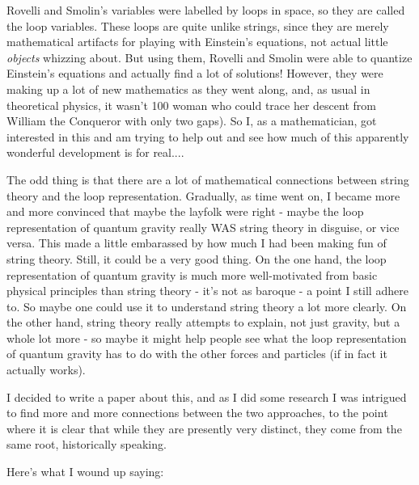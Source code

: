 Rovelli and Smolin's variables were labelled by loops in space, so they
are called the loop variables.  These loops are quite unlike strings,
since they are merely mathematical artifacts for playing with Einstein's
equations, not actual little \emph{objects} whizzing about.  But using them,
Rovelli and Smolin were able to quantize Einstein's equations and
actually find a lot of solutions!  However, they were making up a lot of
new mathematics as they went along, and, as usual in theoretical
physics, it wasn't 100%
woman who could trace her descent from William the Conqueror with only
two gaps).  So I, as a mathematician, got interested in this and am
trying to help out and see how much of this apparently wonderful
development is for real....

The odd thing is that there are a lot of mathematical connections
between string theory and the loop representation.  Gradually, as time
went on, I became more and more convinced that maybe the layfolk were
right - maybe the loop representation of quantum gravity really WAS
string theory in disguise, or vice versa.  This made a little embarassed
by how much I had been making fun of string theory.  Still, it could be
a very good thing.  On the one hand, the loop representation of quantum
gravity is much more well-motivated from basic physical principles than
string theory - it's not as baroque - a point I still adhere to.  So
maybe one could use it to understand string theory a lot more clearly.
On the other hand, string theory really attempts to explain, not just
gravity, but a whole lot more - so maybe it might help people see what
the loop representation of quantum gravity has to do with the other
forces and particles (if in fact it actually works).  

I decided to write a paper about this, and as I did some research I was
intrigued to find more and more connections between the two approaches,
to the point where it is clear that while they are presently very
distinct, they come from the same root, historically speaking.  

Here's what I wound up saying:

